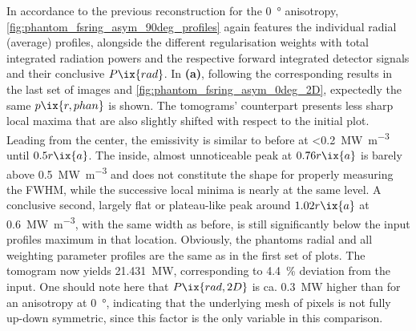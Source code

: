 %
                In accordance to the previous reconstruction for the \SI{0}{\degree} anisotropy, \cref{fig:phantom_fsring_asym_90deg_profiles} again features the individual radial (average) profiles, alongside the different regularisation weights with total integrated radiation powers and the respective forward integrated detector signals and their conclusive $P\ix{rad}$. In \textbf{(a)}, following the corresponding results in the last set of images and \cref{fig:phantom_fsring_asym_0deg_2D}, expectedly the same $p\ix{r,phan}$ is shown. The tomograms' counterpart presents less sharp local maxima that are also slightly shifted with respect to the initial plot. Leading from the center, the emissivity is similar to before at <\SI{0.2}{\mega\watt\per\cubic\meter} until $0.5r\ix{a}$. The inside, almost unnoticeable peak at $0.76r\ix{a}$ is barely above \SI{0.5}{\mega\watt\per\cubic\meter} and does not constitute the shape for properly measuring the FWHM, while the successive local minima is nearly at the same level. A conclusive second, largely flat or plateau-like peak around $1.02r\ix{a}$ at \SI{0.6}{\mega\watt\per\cubic\meter}, with the same width as before, is still significantly below the input profiles maximum in that location. Obviously, the phantoms radial and all weighting parameter profiles are the same as in the first set of plots. The tomogram now yields \SI{21.431}{\mega\watt}, corresponding to \SI{4.4}{\percent} deviation from the input. One should note here that $P\ix{rad,2D}$ is ca. \SI{0.3}{\mega\watt} higher than for an anisotropy at \SI{0}{\degree}, indicating that the underlying mesh of pixels is not fully up-down symmetric, since this factor is the only variable in this comparison.\\%
